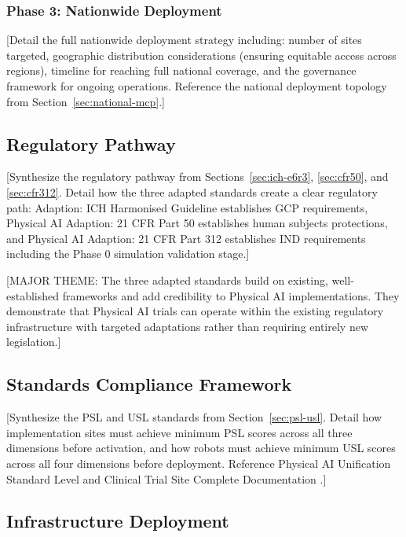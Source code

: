\subsubsection{Phase 3: Nationwide Deployment}
[Detail the full nationwide deployment strategy including: number of sites
targeted, geographic distribution considerations (ensuring equitable access
across regions), timeline for reaching full national coverage, and the
governance framework for ongoing operations. Reference the national deployment
topology from Section~\ref{sec:national-mcp}.]

\subsection{Regulatory Pathway}
\label{subsec:impl-regulatory}

[Synthesize the regulatory pathway from Sections~\ref{sec:ich-e6r3},
\ref{sec:cfr50}, and \ref{sec:cfr312}. Detail how the three adapted
standards create a clear regulatory path: Adaption: ICH Harmonised Guideline
\cite{ich-adapt} establishes GCP requirements, Physical AI Adaption: 21 CFR
Part 50 \cite{cfr50-adapt} establishes human subjects protections, and
Physical AI Adaption: 21 CFR Part 312 \cite{cfr312-adapt} establishes IND
requirements including the Phase 0 simulation validation stage.]

[MAJOR THEME: The three adapted standards build on existing, well-established
frameworks and add credibility to Physical AI implementations. They
demonstrate that Physical AI trials can operate within the existing regulatory
infrastructure with targeted adaptations rather than requiring entirely new
legislation.]

\subsection{Standards Compliance Framework}
\label{subsec:impl-standards}

[Synthesize the PSL and USL standards from Section~\ref{sec:psl-usl}.
Detail how implementation sites must achieve minimum PSL scores across
all three dimensions before activation, and how robots must achieve minimum
USL scores across all four dimensions before deployment. Reference Physical AI
Unification Standard Level \cite{usl-standard} and Clinical Trial Site
Complete Documentation \cite{site-docs}.]

\subsection{Infrastructure Deployment}
\label{subsec:impl-infrastructure}

